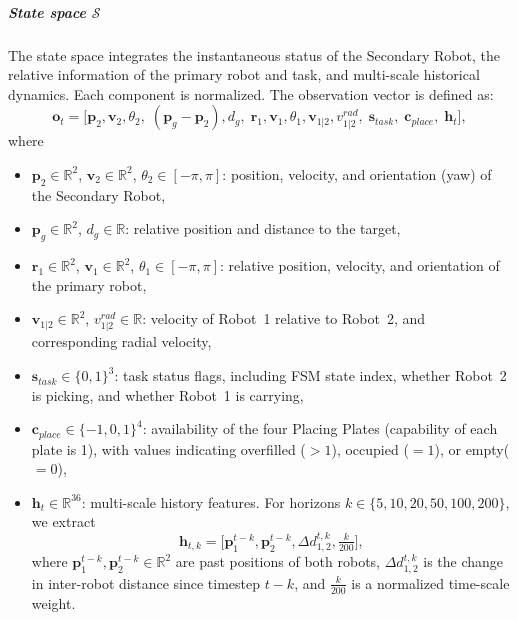 \documentclass[english, 12pt, a4paper, elec, utf8, a-2b, online]{aaltothesis}
\begin{document}
\subparagraph{State space $\mathcal{S}$}
The state space integrates the instantaneous status of the Secondary Robot, the relative information of the primary robot and task, and multi-scale historical dynamics. Each component is normalized. The observation vector is defined as:
\begin{equation}
\mathbf{o}_t = \big[ \mathbf{p}_2, \mathbf{v}_2, \theta_2, \; (\mathbf{p}_{g} - \mathbf{p}_2), d_{g}, \; \mathbf{r}_1, \mathbf{v}_1, \theta_1, \mathbf{v}_{1|2}, v^{rad}_{1|2}, \; \mathbf{s}_{task}, \; \mathbf{c}_{place}, \; \mathbf{h}_t \big],
\end{equation}
where
\begin{itemize}
    \item $\mathbf{p}_2 \in \mathbb{R}^2$, $\mathbf{v}_2 \in \mathbb{R}^2$, $\theta_2 \in [-\pi,\pi]$: position, velocity, and orientation (yaw) of the Secondary Robot,
    \item $\mathbf{p}_{g} \in \mathbb{R}^2$, $d_g \in \mathbb{R}$: relative position and distance to the target,
    \item $\mathbf{r}_1 \in \mathbb{R}^2$, $\mathbf{v}_1 \in \mathbb{R}^2$, $\theta_1 \in [-\pi,\pi]$: relative position, velocity, and orientation of the primary robot,
    \item $\mathbf{v}_{1|2} \in \mathbb{R}^2$, $v^{rad}_{1|2} \in \mathbb{R}$: velocity of Robot~1 relative to Robot~2, and corresponding radial velocity,
    \item $\mathbf{s}_{task} \in \{0,1\}^3$: task status flags, including FSM state index, whether Robot~2 is picking, and whether Robot~1 is carrying,
    \item $\mathbf{c}_{place} \in \{-1,0,1\}^4$: availability of the four Placing Plates (capability of each plate is 1), with values indicating overfilled ($>1$), occupied ($=1$), or empty($=0$),
    \item $\mathbf{h}_t \in \mathbb{R}^{36}$: multi-scale history features. For horizons $k \in \{5,10,20,50,100,200\}$, we extract
    \begin{equation}
    \mathbf{h}_{t,k} = \big[ \mathbf{p}_1^{t-k}, \mathbf{p}_2^{t-k}, \Delta d_{1,2}^{t,k}, \tfrac{k}{200} \big],
    \end{equation}
    where $\mathbf{p}_1^{t-k}, \mathbf{p}_2^{t-k} \in \mathbb{R}^2$ are past positions of both robots, $\Delta d_{1,2}^{t,k}$ is the change in inter-robot distance since timestep $t-k$, and $\tfrac{k}{200}$ is a normalized time-scale weight.
\end{itemize}
\end{document}
